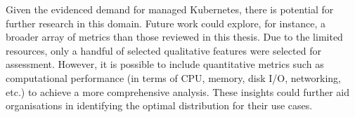 Given the evidenced demand for managed Kubernetes, there is potential for further research in this domain. Future work could explore, for instance, a broader array of metrics than those reviewed in this thesis. Due to the limited resources, only a handful of selected qualitative features were selected for assessment. However, it is possible to include quantitative metrics such as computational performance (in terms of CPU, memory, disk I/O, networking, etc.) to achieve a more comprehensive analysis. These insights could further aid organisations in identifying the optimal distribution for their use cases.






















